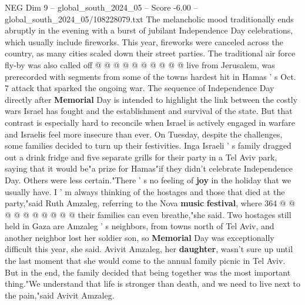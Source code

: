 \begin{textsample}{NEG Dim 9 – global\_south\_2024\_05 – Score -6.00 – global\_south\_2024\_05/108228079.txt}
The melancholic mood traditionally ends abruptly in the evening with a burst of jubilant Independence Day celebrations, which usually include fireworks.
This year, fireworks were canceled across the country, as many cities scaled down their street parties.
The traditional air force fly-by was also called off @ @ @ @ @ @ @ @ @ @ live from Jerusalem, was prerecorded with segments from some of the towns hardest hit in Hamas ' s Oct. 7 attack that sparked the ongoing war.
The sequence of Independence Day directly after \textbf{Memorial} Day is intended to highlight the link between the costly wars Israel has fought and the establishment and survival of the state.
But that contrast is especially hard to reconcile when Israel is actively engaged in warfare and Israelis feel more insecure than ever.
On Tuesday, despite the challenges, some families decided to turn up their festivities.
Inga Israeli ' s family dragged out a drink fridge and five separate grills for their party in a Tel Aviv park, saying that it would be"a prize for Hamas"if they didn't celebrate Independence Day.
Others were less certain."There ' s no feeling of \textbf{joy} in the holiday that we usually have.
I ' m always thinking of the hostages and those that died at the party,"said Ruth Amzaleg, referring to the Nova \textbf{music} \textbf{festival}, where 364 @ @ @ @ @ @ @ @ @ @ their families can even breathe,"she said.
Two hostages still held in Gaza are Amzaleg ' s neighbors, from towns north of Tel Aviv, and another neighbor lost her soldier son, so \textbf{Memorial} Day was exceptionally difficult this year, she said.
Avivit Amzaleg, her \textbf{daughter}, wasn't sure up until the last moment that she would come to the annual family picnic in Tel Aviv.
But in the end, the family decided that being together was the most important thing."We understand that life is stronger than death, and we need to live next to the pain,"said Avivit Amzaleg.

\end{textsample}
